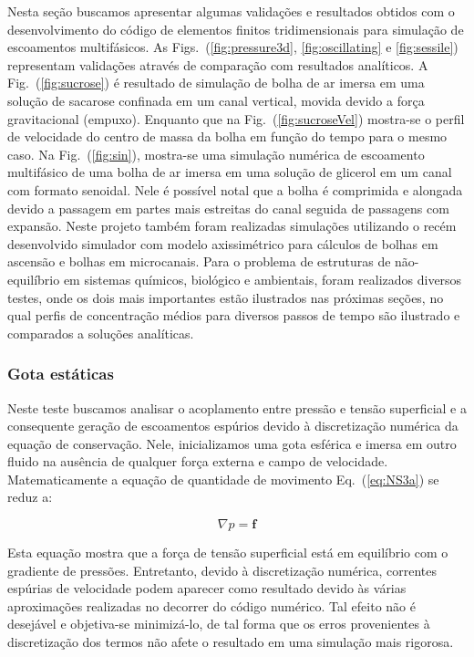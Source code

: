 \documentclass[a4paper,portuges,12pt]{article}
\newcommand{\fvet}{\mathbf{f}}
\begin{document}
Nesta seção buscamos apresentar algumas validações e resultados obtidos
com o desenvolvimento do código de elementos finitos tridimensionais
para simulação de escoamentos multifásicos. As
Figs.~(\ref{fig:pressure3d}, \ref{fig:oscillating} e \ref{fig:sessile})
representam validações através de comparação com resultados analíticos.
A Fig.~(\ref{fig:sucrose}) é resultado de simulação de bolha de ar
imersa em uma solução de sacarose confinada em um canal vertical, movida
devido a força gravitacional (empuxo). Enquanto que na
Fig.~(\ref{fig:sucroseVel}) mostra-se o perfil de velocidade do centro
de massa da bolha em função do tempo para o mesmo caso. Na
Fig.~(\ref{fig:sin}), mostra-se uma simulação numérica de escoamento
multifásico de uma bolha de ar imersa em uma solução de glicerol em um
canal com formato senoidal. Nele é possível notal que a bolha é
comprimida e alongada devido a passagem em partes mais estreitas do
canal seguida de passagens com expansão. Neste projeto também foram
realizadas simulações utilizando o recém desenvolvido simulador
com modelo axissimétrico para cálculos de bolhas em ascensão e bolhas em
microcanais. Para o problema de estruturas de
não-equilíbrio em sistemas químicos, biológico e ambientais, foram
realizados diversos testes, onde os dois mais importantes estão
ilustrados nas próximas seções, no qual perfis de concentração médios
para diversos passos de tempo são ilustrado e comparados a soluções
analíticas. 

\subsubsection{Gota estáticas}

Neste teste buscamos analisar o acoplamento entre pressão e tensão
superficial e a consequente geração de escoamentos espúrios devido à
discretização numérica da equação de conservação. Nele, inicializamos
uma gota esférica e imersa em outro fluido na ausência de qualquer força
externa e campo de velocidade. Matematicamente a equação de quantidade
de movimento Eq.~(\ref{eq:NS3a}) se reduz a:

\begin{equation}
	\nabla p = \fvet
\end{equation}

Esta equação mostra que a força de tensão superficial está em equilíbrio
com o gradiente de pressões. Entretanto, devido à discretização
numérica, correntes espúrias de velocidade podem aparecer como resultado
devido às várias aproximações realizadas no decorrer do código numérico.
Tal efeito não é desejável e objetiva-se minimizá-lo, de tal forma que
os erros provenientes à discretização dos termos não afete o resultado
em uma simulação mais rigorosa. 
\end{document}
